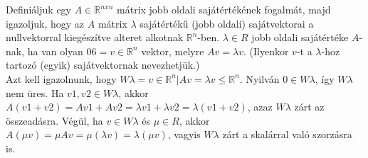 \begin{frame}
  \begin{tcolorbox}[title={15. (4p)}]
       Deﬁniáljuk egy $A \in \mathbb{R}^{n x n}$ mátrix jobb oldali sajátértékének fogalmát, majd igazoljuk, hogy az $A$ mátrix ${\lambda}$ sajátértékű (jobb oldali) sajátvektorai a nullvektorral kiegészítve alteret alkotnak $\mathbb{R}^n$-ben.
  \tcblower
    ${\lambda} \in R$ jobb oldali sajátértéke $A$-nak, ha van olyan $0 6= v \in \mathbb{R}^n$ vektor, melyre $Av = {\lambda}v$. (Ilyenkor $v$-t a ${\lambda}$-hoz tartozó (egyik) sajátvektornak nevezhetjük.)\\
    
    Azt kell igazolnunk, hogy $W{\lambda} = {v \in \mathbb{R}^n |Av = {\lambda}v} ≤ \mathbb{R}^n$. Nyilván $0 \in W{\lambda}$, így $W{\lambda}$ nem üres. Ha $v1,v2 \in W{\lambda}$, akkor $A(v1 +v2) = Av1 +Av2 = {\lambda}v1 +{\lambda}v2 = {\lambda}(v1 +v2)$, azaz $W{\lambda}$ zárt az összeadásra. Végül, ha $v \in W{\lambda}$ és ${\mu} \in R$, akkor $A({\mu}v) = {\mu}Av = {\mu}({\lambda}v) = {\lambda}({\mu}v)$, vagyis $W{\lambda}$ zárt a skalárral való szorzásra is.
  \end{tcolorbox}
\end{frame}



